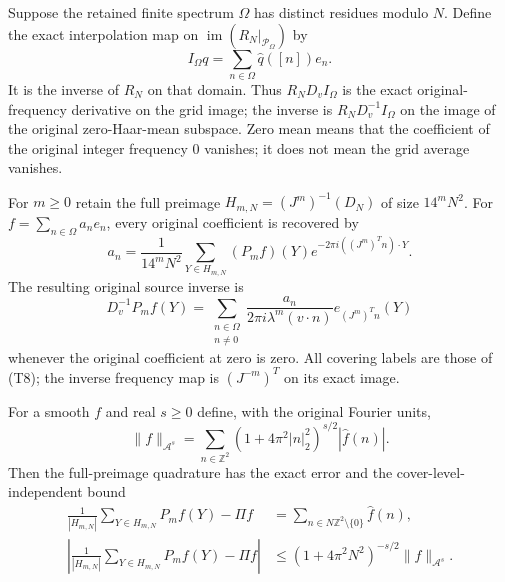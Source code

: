 \begin{theorem}
\label{thm:ns-reverse-lifted-inverse}
Suppose the retained finite spectrum $\Omega$ has distinct
residues modulo $N$. Define the exact interpolation map
on $\operatorname{im}(R_N|_{\mathcal P_\Omega})$ by
\[
 I_\Omega q=\sum_{n\in\Omega}\widehat q([n])e_n.
\]
It is the inverse of $R_N$ on that domain. Thus
$R_ND_vI_\Omega$ is the exact original-frequency
derivative on the grid image; the inverse is
$R_ND_v^{-1}I_\Omega$ on the image of the original
zero-Haar-mean subspace. Zero mean means that the
coefficient of the original integer frequency $0$
vanishes; it does not mean the grid average vanishes.

For $m\ge0$ retain the full preimage
$H_{m,N}=(J^m)^{-1}(D_N)$ of size $14^mN^2$.
For $f=\sum_{n\in\Omega}a_ne_n$, every original coefficient
is recovered by
\[
 a_n=\frac1{14^mN^2}\sum_{Y\in H_{m,N}}
       (P_mf)(Y)e^{-2\pi i((J^m)^Tn)\cdot Y}.
\]
The resulting original source inverse is
\[
 D_v^{-1}P_mf(Y)
 =\sum_{\substack{n\in\Omega\\n\ne0}}
   \frac{a_n}{2\pi i\lambda^m(v\cdot n)}
      e_{(J^m)^Tn}(Y)
\]
whenever the original coefficient at zero is zero.
All covering labels are those of (T8); the inverse
frequency map is $(J^{-m})^T$ on its exact image.

For a smooth $f$ and real $s\ge0$ define, with the
original Fourier units,
\[
 \|f\|_{\mathcal A^s}
 =\sum_{n\in\mathbb Z^2}(1+4\pi^2|n|_2^2)^{s/2}|\widehat f(n)|.
\]
Then the full-preimage quadrature has the exact error
and the cover-level-independent bound
\[
\begin{aligned}
 \frac1{|H_{m,N}|}\sum_{Y\in H_{m,N}}P_mf(Y)-\Pi f
 &=\sum_{n\in N\mathbb Z^2\setminus\{0\}}\widehat f(n),\\
 \left|\frac1{|H_{m,N}|}\sum_{Y\in H_{m,N}}P_mf(Y)-\Pi f\right|
 &\le(1+4\pi^2N^2)^{-s/2}\|f\|_{\mathcal A^s}.
\end{aligned}
\]
\end{theorem}
